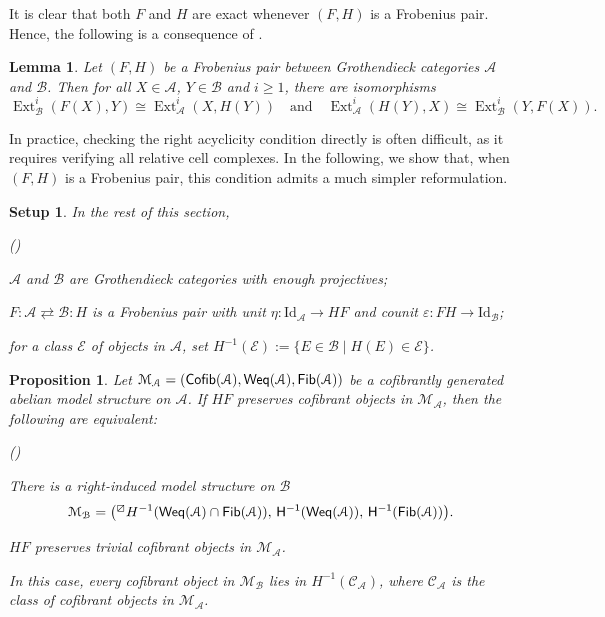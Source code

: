 \documentclass[12pt,twoside]{amsart}
\theoremstyle{bfupright head,slanted body}
\theoremstyle{bfupright head,upright body}
\theoremstyle{fixed bf head,slanted body}
\newtheorem{prp}[res]{Proposition}      \newtheorem*{prp*}{Proposition}
\newtheorem{lem}[res]{Lemma}            \newtheorem*{lem*}{Lemma}
\theoremstyle{fixed bf head,upright body}
\newtheorem{setup}[res]{Setup}           \newtheorem*{setup*}{Setup}
\theoremstyle{numbered paragraph}
\newlength{\thmlistleft}        %
\newlength{\thmlistright}       %
\newlength{\thmlistpartopsep}   %
\newlength{\thmlisttopsep}      %
\newlength{\thmlistparsep}      %
\newlength{\thmlistitemsep}     %
\newcounter{eqc}
\newenvironment{eqc}{\begin{list}{\upshape (\textit{\roman{eqc}})}%
    {\usecounter{eqc}%
      \setlength{\leftmargin}{\thmlistleft}%
      \setlength{\labelwidth}{\thmlistleft}%
      \setlength{\rightmargin}{\thmlistright}%
      \setlength{\partopsep}{\thmlistpartopsep}%
      \setlength{\topsep}{\thmlisttopsep}%
      \setlength{\parsep}{\thmlistparsep}%
      \setlength{\itemsep}{\thmlistitemsep}}}%
  {\end{list}}%
\newcounter{rqm}
\newenvironment{rqm}{\begin{list}{\upshape (\arabic{rqm})}%
    {\usecounter{rqm}%
      \setlength{\leftmargin}{\thmlistleft}%
      \setlength{\labelwidth}{\thmlistleft}%
      \setlength{\rightmargin}{\thmlistright}%
      \setlength{\partopsep}{\thmlistpartopsep}%
      \setlength{\topsep}{\thmlisttopsep}%
      \setlength{\parsep}{\thmlistparsep}%
      \setlength{\itemsep}{\thmlistitemsep}}}%
  {\end{list}}%
\newcommand{\lemcite}[2][?]{\cite[Lemma~#1]{#2}}
\numberwithin{equation}{res}
\newcommand{\calC}{\mathcal{C}}
\newcommand{\calA}{\mathcal{A}}
\newcommand{\calB}{\mathcal{B}}
\newcommand{\calM}{\mathcal{M}}
\newcommand{\calE}{\mathcal{E}}
\newcommand{\Id}{\mathrm{Id}}
\newcommand{\Ext}{\operatorname{Ext}}
\newcommand{\Cofib}{\sf{Cofib}}
\newcommand{\Fib}{\sf{Fib}}
\newcommand{\Weq}{\sf{Weq}}
\begin{document}
It is clear that both \(F\) and \(H\) are exact whenever \((F,H)\) is a Frobenius pair.
Hence, the following is a consequence of \lemcite[5.1]{HolmQUIVER}.

\begin{lem} \label{Ext(F,H)}
Let \((F,H)\) be a Frobenius pair between Grothendieck categories \(\calA\) and \(\calB\).
Then for all \(X\in\calA\), \(Y\in\calB\) and \(i\ge 1\), there are isomorphisms
\[
\Ext_{\calB}^{i}(F(X),Y) \cong \Ext_{\calA}^{i}(X,H(Y))
\quad\text{and}\quad
\Ext_{\calA}^{i}(H(Y),X) \cong \Ext_{\calB}^{i}(Y,F(X)).
\]
\end{lem}

In practice, checking the right acyclicity condition directly is often difficult, as it requires verifying all relative cell complexes. In the following, we show that, when \((F,H)\) is a Frobenius pair, this condition admits a much simpler reformulation.

\begin{setup}
In the rest of this section,
\begin{rqm}
\item[$\bullet$]
\(\calA\) and \(\calB\) are Grothendieck categories with enough projectives;

\item[$\bullet$]
\(F : \calA \rightleftarrows \calB : H\) is a Frobenius pair with unit \(\eta:\Id_{\calA}\to HF\) and counit \(\varepsilon:FH\to\Id_{\calB}\);

\item[\(\bullet\)] for a class \(\calE\) of objects in \(\calA\), set \(H^{-1}(\calE):=\{E\in\calB\mid H(E)\in\calE\}\).
\end{rqm}
\end{setup}

\begin{prp} \label{HF condition}
Let \(\calM_{\calA}=(\Cofib(\mathcal A),\Weq(\mathcal A),\Fib(\mathcal A))\) be a cofibrantly generated abelian model structure on \(\mathcal A\). If \(HF\) preserves cofibrant objects in \(\calM_{\calA}\), then the following are equivalent:
\begin{eqc}
\item There is a right-induced model structure on \(\mathcal B\)
\[
\calM_{\calB}=\bigl({}^{\boxslash}H^{-1}(\Weq(\mathcal A)\cap\Fib(\mathcal A)),\,
H^{-1}(\Weq(\mathcal A)),\,
H^{-1}(\Fib(\mathcal A))\bigr).
\]
\item \(HF\) preserves trivial cofibrant objects in \(\calM_{\calA}\).
\end{eqc}
In this case, every cofibrant object in \(\calM_{\calB}\) lies in \(H^{-1}(\calC_{\calA})\), where \(\calC_{\calA}\) is the class of cofibrant objects in \(\calM_{\calA}\).
\end{prp}
\end{document}
